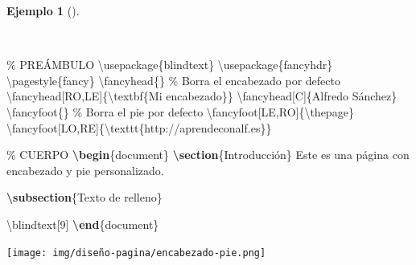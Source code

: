 \documentclass[
  a4paper,
]{scrreport}
\newenvironment{Shaded}{\begin{snugshade}}{\end{snugshade}}
\newcommand{\BuiltInTok}[1]{\textcolor[rgb]{0.00,0.23,0.31}{#1}}
\newcommand{\CommentTok}[1]{\textcolor[rgb]{0.37,0.37,0.37}{#1}}
\newcommand{\ExtensionTok}[1]{\textcolor[rgb]{0.00,0.23,0.31}{#1}}
\newcommand{\FunctionTok}[1]{\textcolor[rgb]{0.28,0.35,0.67}{#1}}
\newcommand{\KeywordTok}[1]{\textcolor[rgb]{0.00,0.23,0.31}{\textbf{#1}}}
\newcommand{\NormalTok}[1]{\textcolor[rgb]{0.00,0.23,0.31}{#1}}
\theoremstyle{definition}
\newtheorem{example}{Ejemplo}[chapter]
\theoremstyle{remark}
\begin{document}
\begin{example}[]\protect\hypertarget{exm-encabezado-pie}{}\label{exm-encabezado-pie}

~

\begin{Shaded}
\begin{Highlighting}[]
\CommentTok{\% PREÁMBULO}
\BuiltInTok{\textbackslash{}usepackage}\NormalTok{\{}\ExtensionTok{blindtext}\NormalTok{\}}
\BuiltInTok{\textbackslash{}usepackage}\NormalTok{\{}\ExtensionTok{fancyhdr}\NormalTok{\}}
\FunctionTok{\textbackslash{}pagestyle}\NormalTok{\{fancy\}}
\FunctionTok{\textbackslash{}fancyhead}\NormalTok{\{\} }\CommentTok{\% Borra el encabezado por defecto}
\FunctionTok{\textbackslash{}fancyhead}\NormalTok{[RO,LE]\{}\FunctionTok{\textbackslash{}textbf}\NormalTok{\{Mi encabezado\}\}}
\FunctionTok{\textbackslash{}fancyhead}\NormalTok{[C]\{Alfredo Sánchez\}}
\FunctionTok{\textbackslash{}fancyfoot}\NormalTok{\{\} }\CommentTok{\% Borra el pie por defecto}
\FunctionTok{\textbackslash{}fancyfoot}\NormalTok{[LE,RO]\{}\FunctionTok{\textbackslash{}thepage}\NormalTok{\}}
\FunctionTok{\textbackslash{}fancyfoot}\NormalTok{[LO,RE]\{}\FunctionTok{\textbackslash{}texttt}\NormalTok{\{http://aprendeconalf.es\}\}}

\CommentTok{\% CUERPO}
\KeywordTok{\textbackslash{}begin}\NormalTok{\{}\ExtensionTok{document}\NormalTok{\}}
\KeywordTok{\textbackslash{}section}\NormalTok{\{Introducción\}}
\NormalTok{Este es una página con encabezado y pie personalizado.}

\KeywordTok{\textbackslash{}subsection}\NormalTok{\{Texto de relleno\}}

\FunctionTok{\textbackslash{}blindtext}\NormalTok{[9]}
\KeywordTok{\textbackslash{}end}\NormalTok{\{}\ExtensionTok{document}\NormalTok{\}}
\end{Highlighting}
\end{Shaded}

\begin{tcolorbox}[enhanced jigsaw, colframe=quarto-callout-note-color-frame, opacityback=0, title={Salida}, bottomrule=.15mm, left=2mm, coltitle=black, arc=.35mm, leftrule=.75mm, colback=white, rightrule=.15mm, colbacktitle=quarto-callout-note-color!10!white, toprule=.15mm, breakable, opacitybacktitle=0.6, bottomtitle=1mm, toptitle=1mm, titlerule=0mm]

\texttt{[image: img/diseño-pagina/encabezado-pie.png]}

\end{tcolorbox}

\end{example}
\end{document}
